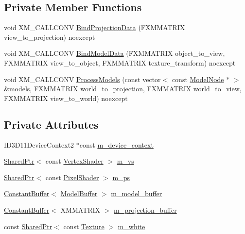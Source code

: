 \subsection*{Private Member Functions}
\begin{DoxyCompactItemize}
\item 
void X\+M\+\_\+\+C\+A\+L\+L\+C\+O\+NV \hyperlink{classmage_1_1_constant_shading_pass_ab4c59f54c89a3672530531de1923b3d7}{Bind\+Projection\+Data} (F\+X\+M\+M\+A\+T\+R\+IX view\+\_\+to\+\_\+projection) noexcept
\item 
void X\+M\+\_\+\+C\+A\+L\+L\+C\+O\+NV \hyperlink{classmage_1_1_constant_shading_pass_a3a7137609e3b949735556458d2cd803d}{Bind\+Model\+Data} (F\+X\+M\+M\+A\+T\+R\+IX object\+\_\+to\+\_\+view, F\+X\+M\+M\+A\+T\+R\+IX view\+\_\+to\+\_\+object, F\+X\+M\+M\+A\+T\+R\+IX texture\+\_\+transform) noexcept
\item 
void X\+M\+\_\+\+C\+A\+L\+L\+C\+O\+NV \hyperlink{classmage_1_1_constant_shading_pass_a74efecf100ea18251d9e5acde63dd242}{Process\+Models} (const vector$<$ const \hyperlink{classmage_1_1_model_node}{Model\+Node} $\ast$ $>$ \&models, F\+X\+M\+M\+A\+T\+R\+IX world\+\_\+to\+\_\+projection, F\+X\+M\+M\+A\+T\+R\+IX world\+\_\+to\+\_\+view, F\+X\+M\+M\+A\+T\+R\+IX view\+\_\+to\+\_\+world) noexcept
\end{DoxyCompactItemize}
\subsection*{Private Attributes}
\begin{DoxyCompactItemize}
\item 
I\+D3\+D11\+Device\+Context2 $\ast$const \hyperlink{classmage_1_1_constant_shading_pass_a743bb9ce4f40514498f36c2d4cf0b32c}{m\+\_\+device\+\_\+context}
\item 
\hyperlink{namespacemage_a1e01ae66713838a7a67d30e44c67703e}{Shared\+Ptr}$<$ const \hyperlink{classmage_1_1_vertex_shader}{Vertex\+Shader} $>$ \hyperlink{classmage_1_1_constant_shading_pass_a3dc25d352bc4b9dcf9b06993e2e46c62}{m\+\_\+vs}
\item 
\hyperlink{namespacemage_a1e01ae66713838a7a67d30e44c67703e}{Shared\+Ptr}$<$ const \hyperlink{namespacemage_ac98506b7edd999ea43ec46fbd0330238}{Pixel\+Shader} $>$ \hyperlink{classmage_1_1_constant_shading_pass_aa7768c70069825ef231bcaa1cba15263}{m\+\_\+ps}
\item 
\hyperlink{structmage_1_1_constant_buffer}{Constant\+Buffer}$<$ \hyperlink{structmage_1_1_model_buffer}{Model\+Buffer} $>$ \hyperlink{classmage_1_1_constant_shading_pass_ae828b9ae1e4cd281f346aca0db34c015}{m\+\_\+model\+\_\+buffer}
\item 
\hyperlink{structmage_1_1_constant_buffer}{Constant\+Buffer}$<$ X\+M\+M\+A\+T\+R\+IX $>$ \hyperlink{classmage_1_1_constant_shading_pass_a30185ffeeccd233573da5db7677a6169}{m\+\_\+projection\+\_\+buffer}
\item 
const \hyperlink{namespacemage_a1e01ae66713838a7a67d30e44c67703e}{Shared\+Ptr}$<$ const \hyperlink{classmage_1_1_texture}{Texture} $>$ \hyperlink{classmage_1_1_constant_shading_pass_aa5c9222b0de16e351b90752150d584d1}{m\+\_\+white}
\end{DoxyCompactItemize}


